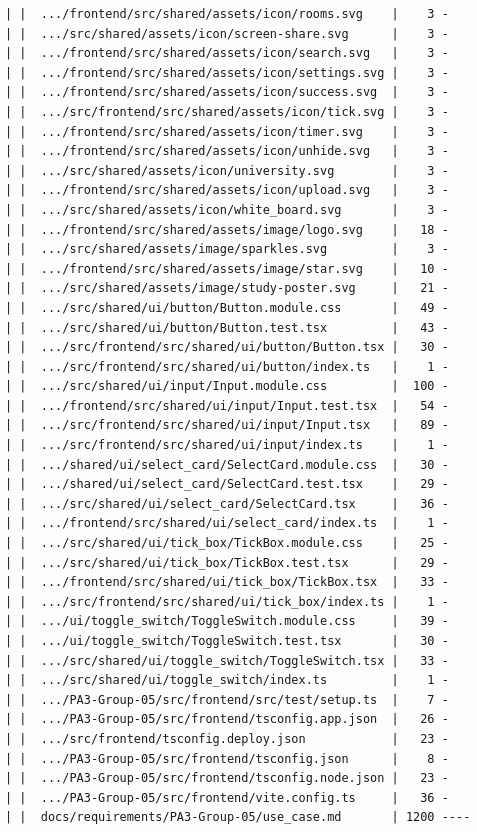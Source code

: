 \documentclass[12pt]{article}
\begin{document}
\begin{lstlisting}[numbers=none,breaklines=true]
| |  .../frontend/src/shared/assets/icon/rooms.svg    |    3 -
| |  .../src/shared/assets/icon/screen-share.svg      |    3 -
| |  .../frontend/src/shared/assets/icon/search.svg   |    3 -
| |  .../frontend/src/shared/assets/icon/settings.svg |    3 -
| |  .../frontend/src/shared/assets/icon/success.svg  |    3 -
| |  .../src/frontend/src/shared/assets/icon/tick.svg |    3 -
| |  .../frontend/src/shared/assets/icon/timer.svg    |    3 -
| |  .../frontend/src/shared/assets/icon/unhide.svg   |    3 -
| |  .../src/shared/assets/icon/university.svg        |    3 -
| |  .../frontend/src/shared/assets/icon/upload.svg   |    3 -
| |  .../src/shared/assets/icon/white_board.svg       |    3 -
| |  .../frontend/src/shared/assets/image/logo.svg    |   18 -
| |  .../src/shared/assets/image/sparkles.svg         |    3 -
| |  .../frontend/src/shared/assets/image/star.svg    |   10 -
| |  .../src/shared/assets/image/study-poster.svg     |   21 -
| |  .../src/shared/ui/button/Button.module.css       |   49 -
| |  .../src/shared/ui/button/Button.test.tsx         |   43 -
| |  .../src/frontend/src/shared/ui/button/Button.tsx |   30 -
| |  .../src/frontend/src/shared/ui/button/index.ts   |    1 -
| |  .../src/shared/ui/input/Input.module.css         |  100 -
| |  .../frontend/src/shared/ui/input/Input.test.tsx  |   54 -
| |  .../src/frontend/src/shared/ui/input/Input.tsx   |   89 -
| |  .../src/frontend/src/shared/ui/input/index.ts    |    1 -
| |  .../shared/ui/select_card/SelectCard.module.css  |   30 -
| |  .../shared/ui/select_card/SelectCard.test.tsx    |   29 -
| |  .../src/shared/ui/select_card/SelectCard.tsx     |   36 -
| |  .../frontend/src/shared/ui/select_card/index.ts  |    1 -
| |  .../src/shared/ui/tick_box/TickBox.module.css    |   25 -
| |  .../src/shared/ui/tick_box/TickBox.test.tsx      |   29 -
| |  .../frontend/src/shared/ui/tick_box/TickBox.tsx  |   33 -
| |  .../src/frontend/src/shared/ui/tick_box/index.ts |    1 -
| |  .../ui/toggle_switch/ToggleSwitch.module.css     |   39 -
| |  .../ui/toggle_switch/ToggleSwitch.test.tsx       |   30 -
| |  .../src/shared/ui/toggle_switch/ToggleSwitch.tsx |   33 -
| |  .../src/shared/ui/toggle_switch/index.ts         |    1 -
| |  .../PA3-Group-05/src/frontend/src/test/setup.ts  |    7 -
| |  .../PA3-Group-05/src/frontend/tsconfig.app.json  |   26 -
| |  .../src/frontend/tsconfig.deploy.json            |   23 -
| |  .../PA3-Group-05/src/frontend/tsconfig.json      |    8 -
| |  .../PA3-Group-05/src/frontend/tsconfig.node.json |   23 -
| |  .../PA3-Group-05/src/frontend/vite.config.ts     |   36 -
| |  docs/requirements/PA3-Group-05/use_case.md       | 1200 ----

\end{lstlisting}
\end{document}
